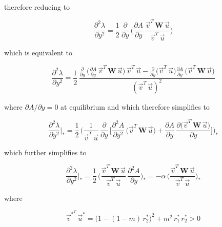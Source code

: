 therefore reducing to

\begin{equation}
    \frac{\partial^2 \lambda}{\partial y^2} = \frac{1}{2}\,\frac{\partial}{\partial y}\,\bigg(\frac{\partial A}{\partial y}\, \frac{\overrightarrow{v}^T\,\pmb W\,\overrightarrow{u}}{\overrightarrow{v}^T\,\overrightarrow{u}}\bigg)
\end{equation}

which is equivalent to

\begin{equation}
    \frac{\partial^2 \lambda}{\partial y^2} = \frac{1}{2}\,\frac{\frac{\partial}{\partial y}\,\Big(\frac{\partial A}{\partial y}\,\overrightarrow{v}^T\,\pmb W\,\overrightarrow{u}\Big)\,\overrightarrow{v}^T\,\overrightarrow{u}-\frac{\partial}{\partial y}\Big(\overrightarrow{v}^T\,\overrightarrow{u}\Big)\frac{\partial A}{\partial y}\,\Big(\overrightarrow{v}^T\,\pmb W\,\overrightarrow{u}\Big)}{(\overrightarrow{v}^T\,\overrightarrow{u})^2}
\end{equation}

where $\partial A / \partial y = 0$ at equilibrium and which therefore simplifies to

\begin{equation}
    \frac{\partial^2 \lambda}{\partial y^2}\bigg|_* = \frac{1}{2}\,\Bigg(\frac{1}{\overrightarrow{v}^T\,\overrightarrow{u}}\,\frac{\partial}{\partial y}\,\bigg[\frac{\partial^2 A}{\partial y^2}\,\Big(\overrightarrow{v}^T\,\pmb W\,\overrightarrow{u}\Big)+\frac{\partial A}{\partial y}\,\frac{\partial \big(\overrightarrow{v}^T\,\pmb W\,\overrightarrow{u}\big)}{\partial y}\bigg]\Bigg)_*
\end{equation}

which further simplifies to

\begin{equation}
    \frac{\partial^2 \lambda}{\partial y^2}\bigg|_* = \frac{1}{2}\,\Bigg(\frac{\overrightarrow{v}^T\,\pmb W\,\overrightarrow{u}}{\overrightarrow{v}^T\,\overrightarrow{u}}\,\frac{\partial^2 A}{\partial y}\Bigg)_* = -\alpha \, \Bigg(\frac{\overrightarrow{v}^T\,\pmb W\,\overrightarrow{u}}{\overrightarrow{v}^T\,\overrightarrow{u}}\Bigg)_*
\end{equation}

where 

\begin{equation}
    \overrightarrow{v}^*^T\,\overrightarrow{u}^* = \big(1-(1-m)\,r^*_2\big)^2 + m^2\,r^*_1\,r^*_2 > 0
\end{equation}

